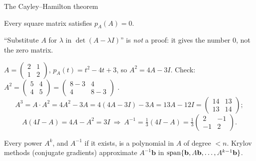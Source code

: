 \documentclass[aspectratio=1610,11pt]{beamer}
\begin{document}
\begin{frame}{The Cayley--Hamilton theorem}
    \begin{theorem}
        \small Every square matrix satisfies $p_A(A) = 0$.
    \end{theorem}
    \small
    ``Substitute $A$ for $\lambda$ in $\det(A - \lambda I)$'' is \emph{not} a proof: it gives the number $0$, not the zero matrix.
    \begin{example}
        \small $A = \begin{pmatrix} 2 & 1 \\ 1 & 2 \end{pmatrix}$, $p_A(t) = t^2 - 4t + 3$, so $A^2 = 4A - 3I$. Check: $A^2 = \begin{pmatrix} 5 & 4 \\ 4 & 5 \end{pmatrix} = \begin{pmatrix} 8 - 3 & 4 \\ 4 & 8 - 3 \end{pmatrix}$ \checkmark.
        \[A^3 = A \cdot A^2 = 4A^2 - 3A = 4(4A - 3I) - 3A = 13A - 12I = \begin{pmatrix} 14 & 13 \\ 13 & 14 \end{pmatrix};\]
        \[A(4I - A) = 4A - A^2 = 3I \ \Rightarrow \ A^{-1} = \tfrac{1}{3}(4I - A) = \tfrac{1}{3}\begin{pmatrix} 2 & -1 \\ -1 & 2 \end{pmatrix}.\]
    \end{example}
    Every power $A^k$, and $A^{-1}$ if it exists, is a polynomial in $A$ of degree $< n$. \textcolor{mlcolor}{Krylov methods (conjugate gradients) approximate $A^{-1}\mathbf{b}$ in $\operatorname{span}\{\mathbf{b}, A\mathbf{b}, \ldots, A^{k-1}\mathbf{b}\}$.}
\end{frame}


\end{document}
